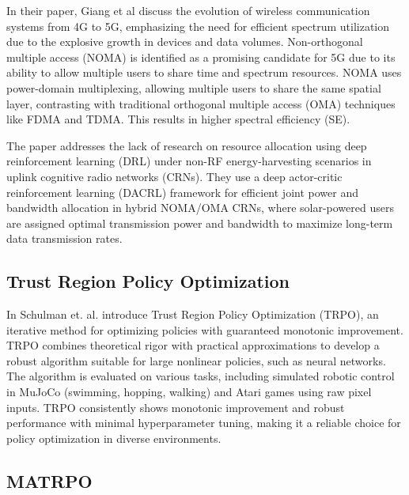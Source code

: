 \documentclass[journal]{IEEEtran}
\begin{document}
In their paper\cite{giang2020}, Giang et al discuss the evolution of wireless communication systems
from 4G to 5G, emphasizing the need for efficient spectrum utilization due to the explosive growth 
in devices and data volumes. Non-orthogonal multiple access (NOMA) is identified as a promising 
candidate for 5G due to its ability to allow multiple users to share time and spectrum resources.
NOMA uses power-domain multiplexing, allowing multiple users to share the same spatial layer, 
contrasting with traditional orthogonal multiple access (OMA) techniques like FDMA and TDMA. 
This results in higher spectral efficiency (SE).

The paper addresses the lack of research on resource allocation using deep reinforcement learning 
(DRL) under non-RF energy-harvesting scenarios in uplink cognitive radio networks (CRNs).
They use a deep actor-critic reinforcement learning (DACRL) framework for efficient joint power and
bandwidth allocation in hybrid NOMA/OMA CRNs, where solar-powered users are assigned optimal 
transmission power and bandwidth to maximize long-term data transmission rates.

\subsection{Trust Region Policy Optimization}
In \cite{schulman2017} Schulman et. al. introduce Trust Region Policy Optimization (TRPO), 
an iterative method for optimizing policies with guaranteed monotonic improvement. 
TRPO combines theoretical rigor with practical approximations to develop a robust algorithm 
suitable for large nonlinear policies, such as neural networks. 
The algorithm is evaluated on various tasks, including simulated robotic control in MuJoCo
(swimming, hopping, walking) and Atari games using raw pixel inputs. 
TRPO consistently shows monotonic improvement and robust performance with minimal hyperparameter 
tuning, making it a reliable choice for policy optimization in diverse environments.




\subsection{MATRPO}
\cite{li2023c}
\end{document}
